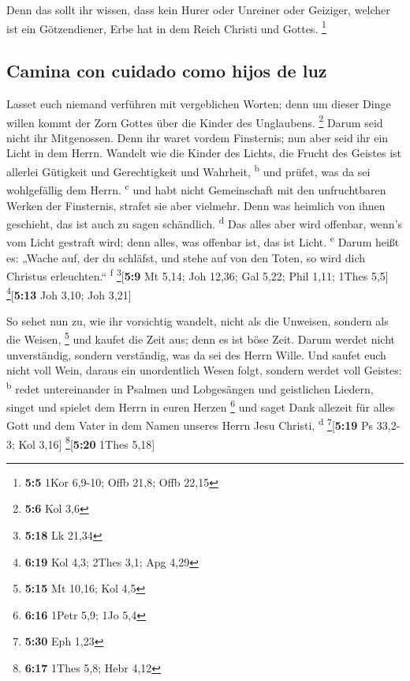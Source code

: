  Denn das sollt ihr wissen, dass kein Hurer oder Unreiner
oder Geiziger, welcher ist ein Götzendiener, Erbe hat in dem Reich
Christi und Gottes. \footnote{\textbf{5:5} 1Kor 6,9-10; Offb 21,8; Offb
  22,15}

\hypertarget{camina-con-cuidado-como-hijos-de-luz}{%
\subsection{Camina con cuidado como hijos de
luz}\label{camina-con-cuidado-como-hijos-de-luz}}

 Lasset euch niemand verführen mit vergeblichen Worten;
denn um dieser Dinge willen kommt der Zorn Gottes über die Kinder des
Unglaubens. \footnote{\textbf{5:6} Kol 3,6}  Darum seid
nicht ihr Mitgenossen.  Denn ihr waret vordem Finsternis;
nun aber seid ihr ein Licht in dem Herrn.  Wandelt wie die
Kinder des Lichts, die Frucht des Geistes ist allerlei Gütigkeit und
Gerechtigkeit und Wahrheit, \textsuperscript{b}  und
prüfet, was da sei wohlgefällig dem Herrn. \textsuperscript{c}
 und habt nicht Gemeinschaft mit den unfruchtbaren Werken
der Finsternis, strafet sie aber vielmehr.  Denn was
heimlich von ihnen geschieht, das ist auch zu sagen schändlich.
\textsuperscript{d}  Das alles aber wird offenbar, wenn's
vom Licht gestraft wird; denn alles, was offenbar ist, das ist Licht.
\textsuperscript{e}  Darum heißt es: „Wache auf, der du
schläfst, und stehe auf von den Toten, so wird dich Christus
erleuchten.`` \textsuperscript{f} \footnote{\textbf{5:18} Lk 21,34}{[}\textbf{5:9}
Mt 5,14; Joh 12,36; Gal 5,22; Phil 1,11; 1Thes 5,5{]}
\footnote{\textbf{6:19} Kol 4,3; 2Thes 3,1; Apg 4,29}{[}\textbf{5:13}
Joh 3,10; Joh 3,21{]}

 So sehet nun zu, wie ihr vorsichtig wandelt, nicht als
die Unweisen, sondern als die Weisen, \footnote{\textbf{5:15} Mt 10,16;
  Kol 4,5}  und kaufet die Zeit aus; denn es ist böse
Zeit.  Darum werdet nicht unverständig, sondern
verständig, was da sei des Herrn Wille.  Und saufet euch
nicht voll Wein, daraus ein unordentlich Wesen folgt, sondern werdet
voll Geistes: \textsuperscript{b}  redet untereinander in
Psalmen und Lobgesängen und geistlichen Liedern, singet und spielet dem
Herrn in euren Herzen \footnote{\textbf{6:16} 1Petr 5,9; 1Jo 5,4}
 und saget Dank allezeit für alles Gott und dem Vater in
dem Namen unseres Herrn Jesu Christi, \textsuperscript{d}
\footnote{\textbf{5:30} Eph 1,23}{[}\textbf{5:19} Ps 33,2-3; Kol 3,16{]}
\footnote{\textbf{6:17} 1Thes 5,8; Hebr 4,12}{[}\textbf{5:20} 1Thes
5,18{]}

